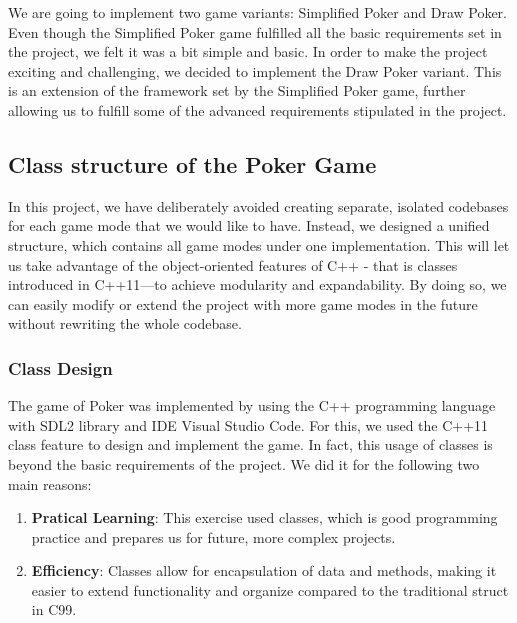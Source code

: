 \hspace{1cm} We are going to implement two game variants: Simplified Poker and Draw Poker. Even though the Simplified Poker game fulfilled all the basic requirements set in the project, we felt it was a bit simple and basic. In order to make the project exciting and challenging, we decided to implement the Draw Poker variant. This is an extension of the framework set by the Simplified Poker game, further allowing us to fulfill some of the advanced requirements stipulated in the project.

\subsection{Class structure of the Poker Game}
\label{subsec:class-structure-of-the-poker-game}

\hspace{1cm} In this project, we have deliberately avoided creating separate, isolated codebases for each game mode that we would like to have. Instead, we designed a unified structure, which contains all game modes under one implementation. This will let us take advantage of the object-oriented features of C++ - that is classes introduced in C++11—to achieve modularity and expandability. By doing so, we can easily modify or extend the project with more game modes in the future without rewriting the whole codebase.


\subsubsection{Class Design}
\label{subsubsec:class-design}

\hspace{1cm} The game of Poker was implemented by using the C++ programming language with SDL2 library and IDE Visual Studio Code. For this, we used the C++11 class feature to design and implement the game. In fact, this usage of classes is beyond the basic requirements of the project. We did it for the following two main reasons:

\begin{enumerate}
    \item \textbf{Pratical Learning}: This exercise used classes, which is good programming practice and prepares us for future, more complex projects.
    \item \textbf{Efficiency}: Classes allow for encapsulation of data and methods, making it easier to extend functionality and organize compared to the traditional struct in C99.
\end{enumerate}

